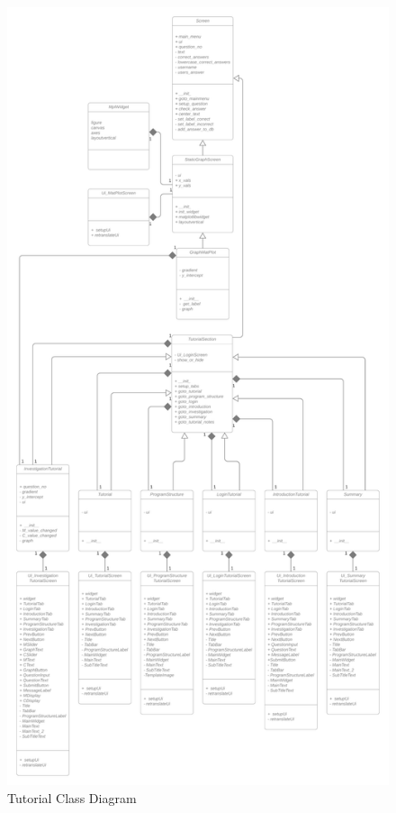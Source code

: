 \documentclass{article}
\begin{document}
\begin{figure}[h]
    \centering
    \captionsetup{justification=centering}
    \includegraphics[scale=0.08]{tutorial-class-diagram}
    \caption{Tutorial Class Diagram}
\end{figure}

\clearpage
\nocite{*}
\printbibliography
{}
\end{document}
